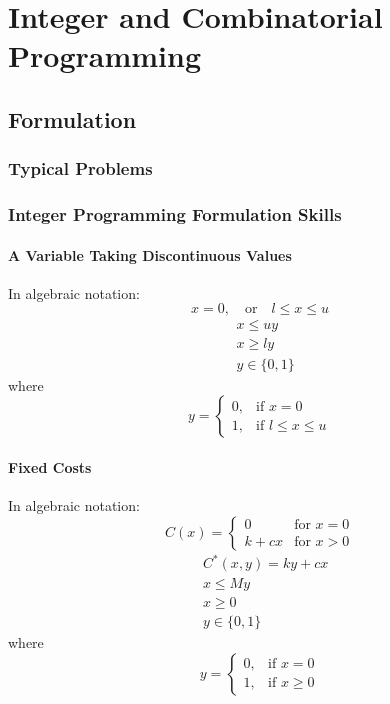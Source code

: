 \documentclass[10pt]{book}
\begin{document}
	\part{Integer and Combinatorial Programming}
		\chapter{Formulation}
			\section{Typical Problems}

			\section{Integer Programming Formulation Skills}
				\subsection{A Variable Taking Discontinuous Values}
					 In algebraic notation: 
					\begin{equation}
						x = 0,\quad \text{or} \quad l\le x \le u \nonumber
					\end{equation}
					\begin{align}
						& x \le uy\nonumber \\
						& x \ge ly \nonumber \\
						& y \in \{0, 1\} \nonumber
					\end{align}
					where
					\begin{equation}y=\begin{cases}0, & \text{if }x=0 \\ 1, & \text{if } l\le x \le u\end{cases}\nonumber \end{equation}
						
				\subsection{Fixed Costs}
					 In algebraic notation: 
					\begin{equation}
						C(x) = \begin{cases} 0 & \text{for } x=0 \\ k + cx & \text{for } x > 0 \end{cases} \nonumber
					\end{equation}
					\begin{align}
						& C^*(x, y) = ky+cx\nonumber\\
						& x \le My \nonumber \\
						& x \ge 0 \nonumber\\
						& y \in \{0, 1\} \nonumber
					\end{align}
					where
					\begin{equation}y=\begin{cases}0, & \text{if }x=0 \\ 1, & \text{if }x\ge 0\end{cases}\nonumber \end{equation}
				
\end{document}

